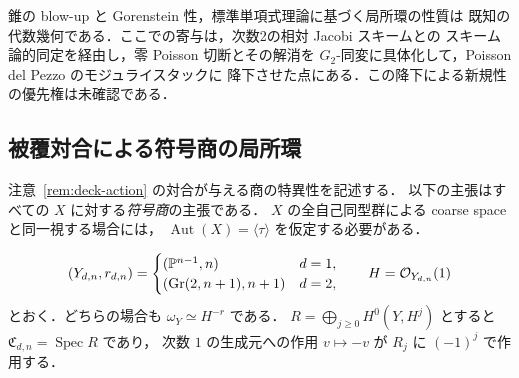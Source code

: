 \begin{remark}
錐の blow-up と Gorenstein 性，標準単項式理論に基づく局所環の性質は
既知の代数幾何である．ここでの寄与は，次数2の相対 Jacobi スキームとの
スキーム論的同定を経由し，零 Poisson 切断とその解消を
$G_2$-同変に具体化して，Poisson del Pezzo のモジュライスタックに
降下させた点にある．この降下による新規性の優先権は未確認である．
\end{remark}

\subsection{被覆対合による符号商の局所環}
\label{subsec:sign-quotient-singularities}

注意~\ref{rem:deck-action} の対合が与える商の特異性を記述する．
以下の主張はすべての $X$ に対する\emph{符号商}の主張である．
$X$ の全自己同型群による coarse space と同一視する場合には，
$\operatorname{Aut}(X)=\langle\tau\rangle$ を仮定する必要がある．

\[
 (Y_{d,n},r_{d,n})=
 \begin{cases}
 (\mathbb P^{n-1},n)&d=1,\\
 (\operatorname{Gr}(2,n+1),n+1)&d=2,
 \end{cases}
 \qquad H=\mathcal O_{Y_{d,n}}(1)
\]
とおく．どちらの場合も $\omega_Y\simeq H^{-r}$ である．
$R=\bigoplus_{j\geq0}H^0(Y,H^j)$ とすると
$\mathfrak C_{d,n}=\operatorname{Spec}R$ であり，
次数 $1$ の生成元への作用 $v\mapsto-v$ が $R_j$ に $(-1)^j$ で作用する．

